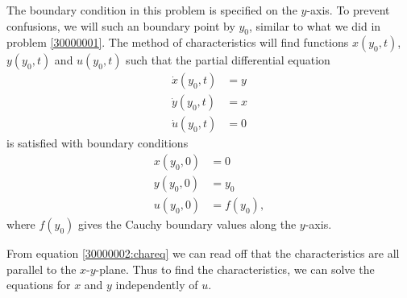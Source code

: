 \begin{loesung}
The boundary condition in this problem is specified on the $y$-axis.
To prevent confusions, we will such an boundary point by $y_0$, similar
to what we did in problem \ref{30000001}.
The method of characteristics will find functions $x(y_0,t)$,
$y(y_0,t)$ and $u(y_0,t)$ such that the partial differential equation
\begin{equation}
\begin{aligned}
\dot x(y_0, t)&=y\\
\dot y(y_0, t)&=x\\
\dot u(y_0, t)&=0
\end{aligned}
\label{30000002:chareq}
\end{equation}
is satisfied with boundary conditions
\begin{align*}
x(y_0, 0)&=0\\
y(y_0, 0)&=y_0\\
u(y_0, 0)&=f(y_0),
\end{align*}
where $f(y_0)$ gives the Cauchy boundary values along the $y$-axis.
\begin{teilaufgaben}
\item
From equation \eqref{30000002:chareq} we can read off that the characteristics
are all parallel to the $x$-$y$-plane.
Thus to find the characteristics, we can solve the equations for $x$ and $y$
independently of $u$.


\end{teilaufgaben}
\end{loesung}
